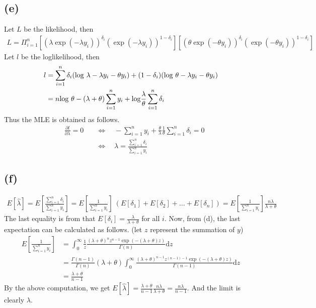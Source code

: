 \documentclass{article}
\begin{document}
\subsection{(e)}
Let $L$ be the likelihood, then
\begin{align*}
	L = \Pi_{i=1}^n \left[ (\lambda \exp(-\lambda y_i))^{\delta_i} (\exp(-\lambda y_i))^{1-\delta_i} \right] \left[ (\theta \exp(-\theta y_i))^{\delta_i} (\exp(-\theta y_i))^{1-\delta_i} \right]
\end{align*}
Let $l$ be the loglikelihood, then
\begin{align*}
	l &= \sum_{i=1}^n \delta_i ({\rm log}\ \lambda - \lambda y_i - \theta y_i) + (1 - \delta_i) ({\rm log}\ \theta - \lambda y_i - \theta y_i)\\
	&= n {\rm log}\ \theta - (\lambda+\theta) \sum_{i=1}^n y_i + {\rm log} \frac{\lambda}{\theta} \sum_{i=1}^n \delta_i
\end{align*}
Thus the MLE is obtained as follows.
\begin{align*}
	\quad \frac{\partial l}{\partial \lambda} = 0 &\quad \Leftrightarrow \quad -\sum_{i=1}^n y_i + \frac{\theta}{\lambda} \frac{1}{\theta} \sum_{i=1}^n \delta_i = 0 \\[10pt]
	&\quad \Leftrightarrow \quad \lambda = \frac{\sum_{i=1}^n \delta_i}{\sum_{i=1}^n y_i}
\end{align*}

\subsection{(f)}
\begin{align*}
	E[\hat{\lambda}] = E\left[ \frac{\sum_{i=1}^n \delta_i }{\sum_{i=1}^n y_i} \right] = E\left[\frac{1}{\sum_{i=1}^n y_i} \right]\ (E[\delta_1] + E[\delta_2] + \dots + E[\delta_n]) = E\left[\frac{1}{\sum_{i=1}^n y_i} \right] \frac{n\lambda}{\lambda + \theta}
\end{align*}
The last equality is from that $E[\delta_i] = \frac{\lambda}{\lambda+\theta}$ for all $i$. Now, from (d), the last expectation can be calculated as follows. (let $z$ represent the summation of $y$)
\begin{align*}
	E\left[\frac{1}{\sum_{i=1}^n y_i} \right] &= \int_0^{\infty} \frac{1}{z} \frac{(\lambda+\theta)^n z^{n-1} \exp(-(\lambda+\theta)z)}{\Gamma(n)} \mathrm{d}z\\[10pt]
	&= \frac{\Gamma(n-1)}{\Gamma(n)} (\lambda+\theta) \int_0^{\infty} \frac{(\lambda+\theta)^{n-1} z^{(n-1) -1} \exp(-(\lambda+\theta)z)}{\Gamma(n-1)} \mathrm{d}z\\[10pt]
	&= \frac{\lambda+\theta}{n-1}
\end{align*}
By the above computation, we get $E[\hat{\lambda}] = \frac{\lambda+\theta}{n-1} \frac{n\lambda}{\lambda+\theta} = \frac{n\lambda}{n-1}$. And the limit is clearly $\lambda$.
\end{document}
